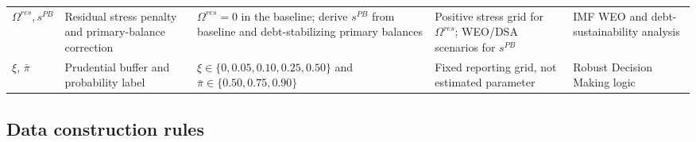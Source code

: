 \documentclass[11pt,a4paper]{article}
\begin{document}
\begin{longtable}{p{}p{}p{}p{}p{}}
$\Omega^{res},s^{PB}$ & Residual stress penalty and primary-balance correction & $\Omega^{res}=0$ in the baseline; derive $s^{PB}$ from baseline and debt-stabilizing primary balances & Positive stress grid for $\Omega^{res}$; WEO/DSA scenarios for $s^{PB}$ & IMF WEO and debt-sustainability analysis \\
$\xi$, $\bar\pi$ & Prudential buffer and probability label & $\xi\in\{0,0.05,0.10,0.25,0.50\}$ and $\bar\pi\in\{0.50,0.75,0.90\}$ & Fixed reporting grid, not estimated parameter & Robust Decision Making logic \citep{lempert2003shaping,rand2013rdm} \\
\bottomrule
\end{longtable}
\normalsize

\subsection{Data construction rules}
\end{document}
